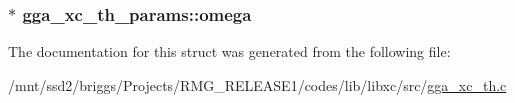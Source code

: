 \hypertarget{structgga__xc__th__params_a097868e6695d3df1019e5239989acf98}{
\subsubsection[{omega}]{ $\ast$ gga\-\_\-xc\-\_\-th\-\_\-params\-::omega}}\label{structgga__xc__th__params_a097868e6695d3df1019e5239989acf98}


The documentation for this struct was generated from the following file\-:\begin{DoxyCompactItemize}
\item 
/mnt/ssd2/briggs/\-Projects/\-R\-M\-G\-\_\-\-R\-E\-L\-E\-A\-S\-E1/codes/lib/libxc/src/\hyperlink{gga__xc__th_8c}{gga\-\_\-xc\-\_\-th.\-c}\end{DoxyCompactItemize}
